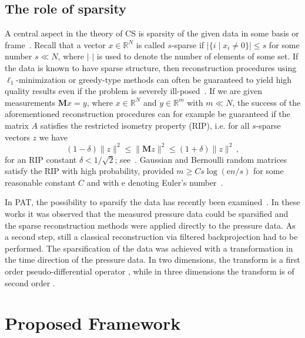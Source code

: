 \documentclass[11pt]{article}
\newcommand{\R}{\mathbb R}
\newcommand{\fullop}{\mathbf M}
\begin{document}
\subsection{The role of sparsity} \label{S:sparsity}

A central aspect in the theory of CS  is sparsity of the given data in some basis or frame~\cite{CanRomTao06a,Don06,foucart2013mathematical}. Recall that a vector $x\in\R^N$ is called
$s$-sparse if $\lvert \{i \mid x_i \neq0 \} \rvert \leq s$ for some number $s\ll N$, where $\lvert \,\dot \, \rvert$ is used to denote the number of elements of some
set.
If the data is known to have sparse structure, then reconstruction procedures using $\ell_1$-minimization or greedy-type methods can often be guaranteed to yield high quality results even if the problem is severely ill-posed~\cite{CanRomTao06a,GraHalSch11}.
If we are given measurements $\fullop x = y$, where $x\in\R^N$ and $y\in\R^m$ with $m\ll N$, the success of the aforementioned reconstruction procedures can for example be guaranteed if the matrix $A$ satisfies the restricted isometry property (RIP), i.e. for all $s$-sparse vectors $z$ we have
\begin{equation} \label{eq:RIP}
(1-\delta)\|z\|^2\leq \| \fullop z\|^2\leq(1+\delta)\|z\|^2 \,,
\end{equation}
for an RIP constant $\delta < 1/\sqrt{2}$; see~\cite{foucart2013mathematical}.
Gaussian and Bernoulli random matrices satisfy the RIP with high probability, provided $m \geq C s \log(\mathrm{e} n/s)$ for some reasonable constant $C$ and with $\mathrm{e}$ denoting Euler's number~\cite{baraniuk2008simple}.

In PAT, the possibility to sparsify the data has recently been examined~\cite{sandbichler2015novel,haltmeier2016compressed}.
In these works it was observed that the measured pressure data could be sparsified and the sparse reconstruction methods were applied directly to the pressure data. As a second step, still a classical reconstruction via filtered backprojection had to be performed.
The sparsification of the data was achieved with a transformation in the time direction of the pressure data. In two dimensions, the transform is a first order pseudo-differential operator \cite{sandbichler2015novel}, while in three dimensions the transform is of second order \cite{haltmeier2016compressed}.



\section{Proposed Framework}
\label{sec:proposed}
\end{document}
